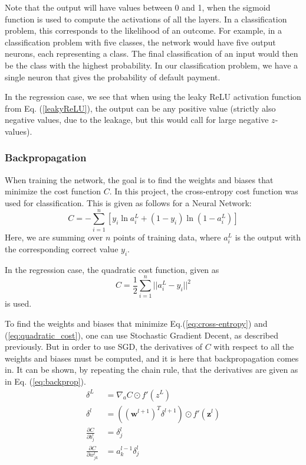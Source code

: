 Note that the output will have values between 0 and 1, when the sigmoid function is used to compute the activations of all the layers. In a classification problem, this corresponds to the likelihood of an outcome. For example, in a classification problem with five classes, the network would have five output neurons, each representing a class. The final classification of an input would then be the class with the highest probability. In our classification problem, we have a single neuron that gives the probability of default payment. 

In the regression case, we see that when using the leaky ReLU activation function from Eq. (\ref{leakyReLU}), the output can be any positive value (strictly also negative values, due to the leakage, but this would call for large negative $z$-values).

\subsubsection*{Backpropagation}
When training the network, the goal is to find the weights and biases that minimize the cost function $C$. In this project, the cross-entropy cost function was used for classification. This is given as follows for a Neural Network: 
\begin{equation}\label{eq:cross-entropy}
	C = -\sum_{i=1}^n\left[y_i\ln a^L_i + (1-y_i)\ln(1-a^L_i)\right]
\end{equation}
Here, we are summing over $n$ points of training data, where $a_i^L$ is the output with the corresponding correct value $y_i$.

In the regression case, the quadratic cost function, given as
\begin{equation}\label{eq:quadratic_cost}
  C = \frac{1}{2}\sum_{i=1}^n||a_i^L-y_i||^2
\end{equation}
is used.

To find the weights and biases that minimize Eq.(\ref{eq:cross-entropy}) and (\ref{eq:quadratic_cost}), one can use Stochastic Gradient Decent, as described previously. But in order to use SGD, the derivatives of $C$ with respect to all the weights and biases must be computed, and it is here that backpropagation comes in. It can be shown, by repeating the chain rule, that the derivatives are given as in Eq. (\ref{eq:backprop}).
\begin{equation}\label{eq:backprop}
\begin{aligned}
	\delta^L &= \nabla_aC\odot f'(z^L)\\
	\delta^l &= ((\boldsymbol{w}^{l+1})^T\delta^{l+1})\odot f'(\boldsymbol{z}^l) \\
	\frac{\partial C}{\partial b^l_j} &= \delta_j^l \\
	\frac{\partial C}{\partial w_{jk}^l} &= a_k^{l-1}\delta^l_j
\end{aligned}
\end{equation}

